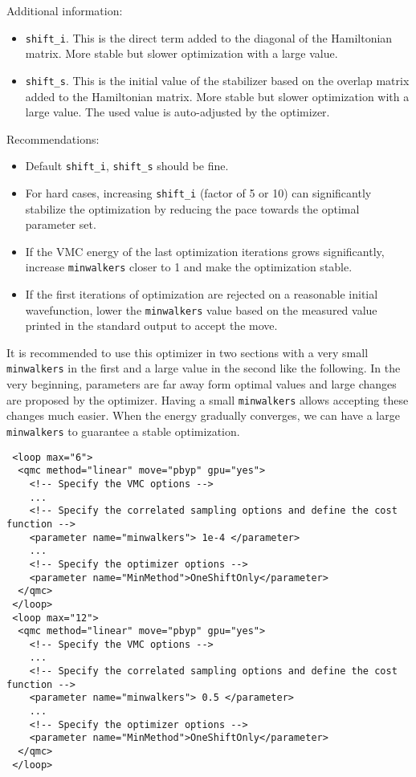 Additional information:
\begin{itemize}
\item \texttt{shift\_i}. This is the direct term added to the diagonal of the Hamiltonian matrix.
                         More stable but slower optimization with a large value.
\item \texttt{shift\_s}. This is the initial value of the stabilizer based on the overlap matrix added to the Hamiltonian matrix. 
                         More stable but slower optimization with a large value. The used value is auto-adjusted by the optimizer.
\end{itemize}


Recommendations:
\begin{itemize}
  \item Default \texttt{shift\_i}, \texttt{shift\_s} should be fine.
  \item For hard cases, increasing \texttt{shift\_i} (factor of 5 or 10) can significantly stabilize the optimization by reducing the pace towards the optimal parameter set.
  \item If the VMC energy of the last optimization iterations grows significantly, increase \texttt{minwalkers} closer to 1 and make the optimization stable.
  \item If the first iterations of optimization are rejected on a reasonable initial wavefunction, 
        lower the \texttt{minwalkers} value based on the measured value printed in the standard output to accept the move.
\end{itemize}

It is recommended to use this optimizer in two sections with a very small \texttt{minwalkers} in the first and a large value in the second like the following.
In the very beginning, parameters are far away form optimal values and large changes are proposed by the optimizer.
Having a small \texttt{minwalkers} allows accepting these changes much easier.
When the energy gradually converges, we can have a large \texttt{minwalkers} to guarantee a stable optimization.
\begin{lstlisting}
 <loop max="6">
  <qmc method="linear" move="pbyp" gpu="yes">
    <!-- Specify the VMC options -->
    ...
    <!-- Specify the correlated sampling options and define the cost function -->
    <parameter name="minwalkers"> 1e-4 </parameter>
    ...
    <!-- Specify the optimizer options -->
    <parameter name="MinMethod">OneShiftOnly</parameter>
  </qmc>
 </loop>
 <loop max="12">
  <qmc method="linear" move="pbyp" gpu="yes">
    <!-- Specify the VMC options -->
    ...
    <!-- Specify the correlated sampling options and define the cost function -->
    <parameter name="minwalkers"> 0.5 </parameter>
    ...
    <!-- Specify the optimizer options -->
    <parameter name="MinMethod">OneShiftOnly</parameter>
  </qmc>
 </loop>
\end{lstlisting}

